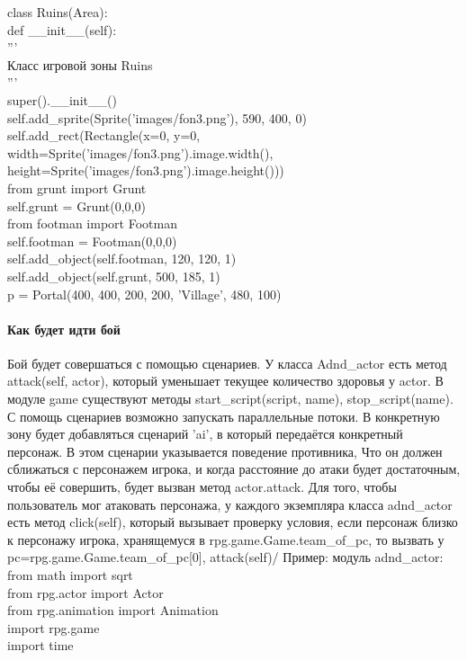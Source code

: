 class Ruins(Area):\\
def \_\_init\_\_(self):\\
'''\\
Класс игровой зоны Ruins\\

'''\\
super().\_\_init\_\_()\\
self.add\_sprite(Sprite('images/fon3.png'), 590, 400, 0)\\
self.add\_rect(Rectangle(x=0, y=0, width=Sprite('images/fon3.png').image.width(), height=Sprite('images/fon3.png').image.height()))\\
from grunt import Grunt\\
self.grunt = Grunt(0,0,0)\\
from footman import Footman\\
self.footman = Footman(0,0,0)\\
self.add\_object(self.footman, 120, 120, 1)\\
self.add\_object(self.grunt, 500, 185, 1)\\
p = Portal(400, 400, 200, 200, 'Village', 480, 100)\\

\paragraph{Как будет идти бой}
Бой будет совершаться с помощью сценариев. У класса Adnd\_actor есть метод attack(self, actor), который уменьшает текущее количество здоровья у actor. В модуле game существуют методы start\_script(script, name), stop\_script(name). С помощь сценариев возможно запускать параллельные потоки. В конкретную зону будет добавляться сценарий 'ai', в который передаётся конкретный персонаж. В этом сценарии указывается поведение противника, Что он должен сближаться с персонажем игрока, и когда расстояние до атаки будет достаточным, чтобы её совершить, будет вызван метод actor.attack. Для того, чтобы пользователь мог атаковать персонажа, у каждого экземпляра класса adnd\_actor есть метод click(self), который вызывает проверку условия, если персонаж близко к персонажу игрока, хранящемуся в rpg.game.Game.team\_of\_pc, то вызвать у pc=rpg.game.Game.team\_of\_pc[0], attack(self)/
Пример:
модуль adnd\_actor:\\
from math import sqrt\\
from rpg.actor import Actor\\
from rpg.animation import Animation\\
import rpg.game\\
import time\\

